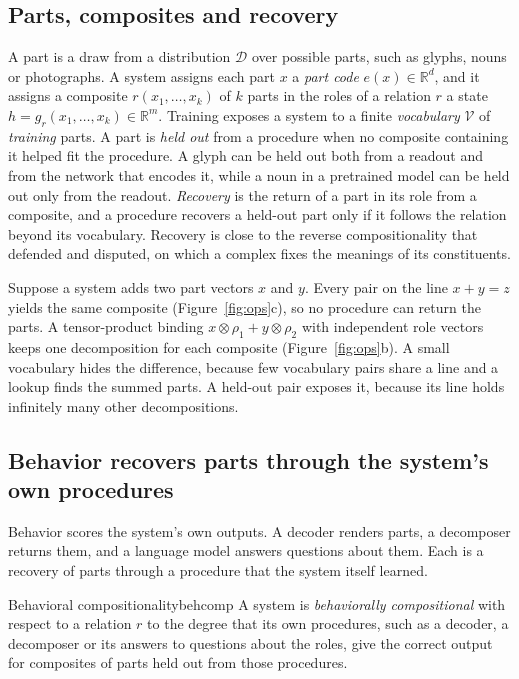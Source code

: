 \documentclass[10pt]{article}
\theoremstyle{plain}
\theoremstyle{remark}
\newcommand{\R}{\mathbb{R}}
\newcommand{\D}{\mathcal{D}}
\newcommand{\Voc}{\mathcal{V}}
\begin{document}
\subsection{Parts, composites and recovery}
\label{sec:intuition}

A part is a draw from a distribution $\D$ over possible parts, such as glyphs, nouns or photographs. A system assigns each part $x$ a \emph{part code} $e(x) \in \R^d$, and it assigns a composite $r(x_1, \ldots, x_k)$ of $k$ parts in the roles of a relation $r$ a state $h = g_r(x_1, \ldots, x_k) \in \R^m$. Training exposes a system to a finite \emph{vocabulary} $\Voc$ of \emph{training} parts. A part is \emph{held out} from a procedure when no composite containing it helped fit the procedure. A glyph can be held out both from a readout and from the network that encodes it, while a noun in a pretrained model can be held out only from the readout. \emph{Recovery} is the return of a part in its role from a composite, and a procedure recovers a held-out part only if it follows the relation beyond its vocabulary. Recovery is close to the reverse compositionality that \citet{fodor2002} defended and \citet{robbins2005} disputed, on which a complex fixes the meanings of its constituents.

Suppose a system adds two part vectors $x$ and $y$. Every pair on the line $x + y = z$ yields the same composite (Figure~\ref{fig:ops}c), so no procedure can return the parts. A tensor-product binding $x \otimes \rho_1 + y \otimes \rho_2$ with independent role vectors \citep{smolensky1990} keeps one decomposition for each composite (Figure~\ref{fig:ops}b). A small vocabulary hides the difference, because few vocabulary pairs share a line and a lookup finds the summed parts. A held-out pair exposes it, because its line holds infinitely many other decompositions.

\subsection{Behavior recovers parts through the system's own procedures}
\label{sec:notions}

Behavior scores the system's own outputs. A decoder renders parts, a decomposer returns them, and a language model answers questions about them. Each is a recovery of parts through a procedure that the system itself learned.

\begin{defbox}{Behavioral compositionality}{behcomp}
A system is \emph{behaviorally compositional} with respect to a relation $r$ to the degree that its own procedures, such as a decoder, a decomposer or its answers to questions about the roles, give the correct output for composites of parts held out from those procedures.
\end{defbox}
\end{document}
